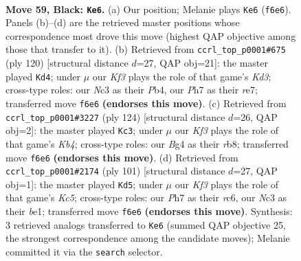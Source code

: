 \documentclass[11pt]{article}
\begin{document}
\clearpage

\begin{figure}[p]\centering
\begin{subfigure}{0.46\textwidth}\centering
\resizebox{\linewidth}{!}{%
\newchessgame
\chessboard[
  setfen={8/7p/5k2/4p3/rpK3b1/2n5/6r1/8 b - - 9 59},
  showmover=false,
  pgfstyle=straightmove, color=movearrow, markmove={f6-e6}
]}
\caption{}
\end{subfigure}\hfill
\begin{subfigure}{0.46\textwidth}\centering
\resizebox{\linewidth}{!}{%
\newchessgame
\chessboard[
  setfen={8/4r3/8/8/kP6/P1RK4/8/8 w - - 11 61},
  showmover=false,
  pgfstyle=straightmove, color=movearrow, markmove={d3-d4}
]}
\caption{}
\end{subfigure}
\\[4pt]
\begin{subfigure}{0.46\textwidth}\centering
\resizebox{\linewidth}{!}{%
\newchessgame
\chessboard[
  setfen={1r6/6p1/8/8/1K4k1/P3R1P1/8/8 w - - 17 63},
  showmover=false,
  pgfstyle=straightmove, color=movearrow, markmove={b4-c3}
]}
\caption{}
\end{subfigure}\hfill
\begin{subfigure}{0.46\textwidth}\centering
\resizebox{\linewidth}{!}{%
\newchessgame
\chessboard[
  setfen={8/8/2R5/4p3/2k5/3r3p/7K/4B3 b - - 3 51},
  showmover=false,
  pgfstyle=straightmove, color=movearrow, markmove={c4-d5}
]}
\caption{}
\end{subfigure}
\caption{\textbf{Move 59, Black: \texttt{Ke6}.} (a) Our position; Melanie plays \texttt{Ke6} (\texttt{f6e6}). Panels (b)--(d) are the retrieved master positions whose correspondence most drove this move (highest QAP objective among those that transfer to it). (b) Retrieved from \texttt{ccrl\_top\_p0001\#675} (ply 120) [structural distance $d$=27, QAP obj=21]: the master played \texttt{Kd4}; under $\mu$ our \emph{Kf3} plays the role of that game's \emph{Kd3}; cross-type roles: our \emph{N}c3 as their \emph{P}b4, our \emph{P}h7 as their \emph{r}e7; transferred move \texttt{f6e6} \textbf{(endorses this move)}. (c) Retrieved from \texttt{ccrl\_top\_p0001\#3227} (ply 124) [structural distance $d$=26, QAP obj=2]: the master played \texttt{Kc3}; under $\mu$ our \emph{Kf3} plays the role of that game's \emph{Kb4}; cross-type roles: our \emph{B}g4 as their \emph{r}b8; transferred move \texttt{f6e6} \textbf{(endorses this move)}. (d) Retrieved from \texttt{ccrl\_top\_p0001\#2174} (ply 101) [structural distance $d$=27, QAP obj=1]: the master played \texttt{Kd5}; under $\mu$ our \emph{Kf3} plays the role of that game's \emph{Kc5}; cross-type roles: our \emph{P}h7 as their \emph{r}c6, our \emph{N}c3 as their \emph{b}e1; transferred move \texttt{f6e6} \textbf{(endorses this move)}. Synthesis: 3 retrieved analogs transferred to \texttt{Ke6} (summed QAP objective 25, the strongest correspondence among the candidate moves); Melanie committed it via the \texttt{search} selector.}
\label{fig:thought-m117}
\end{figure}
\end{document}
